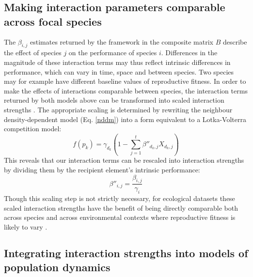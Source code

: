 \documentclass[a4,12pt]{article}
\begin{document}
\begin{refsection}
    \subsection{Making interaction parameters comparable across focal species} 

        The $\beta_{i, j}$ estimates returned by the framework in the composite matrix $B$ describe the effect of species $j$ on the performance of species $i$. Differences in the magnitude of these interaction terms may thus reflect intrinsic differences in performance, which can vary in time, space and between species. Two species may for example have different baseline values of reproductive fitness. In order to make the effects of interactions comparable between species, the interaction terms returned by both models above can be transformed into scaled interaction strengths \parencite{Laska1998}. The appropriate scaling is determined by rewriting the neighbour density-dependent model (Eq. \ref{nddm}) into a form equivalent to a Lotka-Volterra competition model: 
        \begin{equation}
        f(p_{k}) = \gamma_{d_k} \left ( 1 - \sum_{j=1}^{t} {\beta}''_{d_k, j} X_{d_k, j} \right )
        \label{LVform}
        \end{equation}
        This reveals that our interaction terms can be rescaled into interaction strengths by dividing them by the recipient element's intrinsic performance:  
        \begin{equation}
        {\beta}''_{i, j} = \frac{\beta_{i, j}}{\gamma_{i}}
        \label{scaling}
        \end{equation}
        Though this scaling step is not strictly necessary, for ecological datasets these scaled interaction strengths have the benefit of being directly comparable both across species and across environmental contexts where reproductive fitness is likely to vary \parencite{Wootton2005}.

    \subsection{Integrating interaction strengths into models of population dynamics}


\end{refsection}
\end{document}

